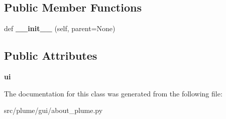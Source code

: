 \subsection*{Public Member Functions}
\begin{DoxyCompactItemize}
\item 
def {\bfseries \+\_\+\+\_\+init\+\_\+\+\_\+} (self, parent=None)\hypertarget{classplume-creator_1_1src_1_1plume_1_1gui_1_1about__plume_1_1_about_plume_ad0bd68f71cb38aa615d14969f60d7fc6}{}\label{classplume-creator_1_1src_1_1plume_1_1gui_1_1about__plume_1_1_about_plume_ad0bd68f71cb38aa615d14969f60d7fc6}

\end{DoxyCompactItemize}
\subsection*{Public Attributes}
\begin{DoxyCompactItemize}
\item 
{\bfseries ui}\hypertarget{classplume-creator_1_1src_1_1plume_1_1gui_1_1about__plume_1_1_about_plume_a0892e9a713b46fb6d39eade0c1d71edd}{}\label{classplume-creator_1_1src_1_1plume_1_1gui_1_1about__plume_1_1_about_plume_a0892e9a713b46fb6d39eade0c1d71edd}

\end{DoxyCompactItemize}


The documentation for this class was generated from the following file\+:\begin{DoxyCompactItemize}
\item 
src/plume/gui/about\+\_\+plume.\+py\end{DoxyCompactItemize}
